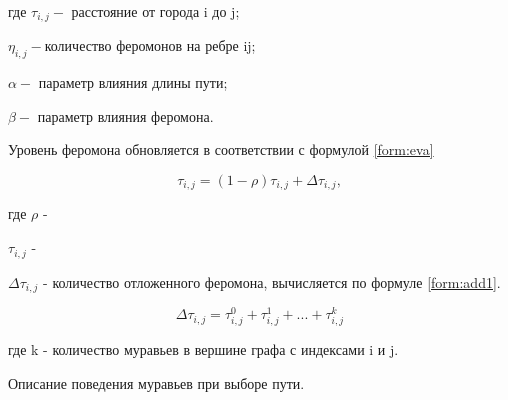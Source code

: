 где $ \tau_{i,j} - $ расстояние от города i до j;

$\eta_{i,j} - $количество феромонов на ребре ij;

$\alpha - $ параметр влияния длины пути;

$\beta - $ параметр влияния феромона.

Уровень феромона обновляется в соответствии с формулой \ref{form:eva}


\begin{equation}\label{form:eva}
	\tau_{i,j}=(1-\rho )\tau_{i,j}+\Delta \tau_{i,j},
\end{equation}

где $\rho$ - 

$\tau_{i,j}$ - 

$\Delta \tau_{i,j}$ - количество отложенного феромона, вычисляется по формуле \ref{form:add1}.

\begin{equation}\label{form:add1}
	\Delta \tau_{i,j}= \tau_{i,j}^0 + \tau_{i,j}^1 + ... + \tau_{i,j}^k
\end{equation}

где k - количество муравьев в вершине графа с индексами i и j.



Описание поведения муравьев при выборе пути.

